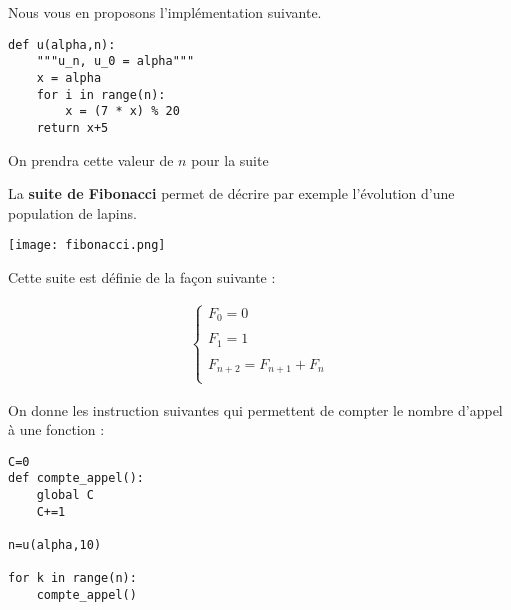 
Nous vous en proposons l'implémentation suivante. 
\begin{lstlisting}
def u(alpha,n):
    """u_n, u_0 = alpha"""
    x = alpha
    for i in range(n):
        x = (7 * x) % 20
    return x+5
\end{lstlisting}



On prendra cette valeur de $n$ pour la suite






La \textbf{suite de Fibonacci} permet de décrire par exemple l'évolution d'une population de lapins.

\begin{center}
\texttt{[image: fibonacci.png]}
\end{center}

Cette suite est définie de la façon suivante : 

\begin{align*}
\left\{
\begin{array}{c}
F_0=0\\
\\
F_1=1\\
\\
F_{n+2}=F_{n+1}+F_{n}\\
\end{array}
\right.
\end{align*}










On donne les instruction suivantes qui permettent de compter le nombre d'appel à une fonction : 


\begin{lstlisting}
C=0
def compte_appel():
    global C
    C+=1

n=u(alpha,10)

for k in range(n):
    compte_appel()
\end{lstlisting}

